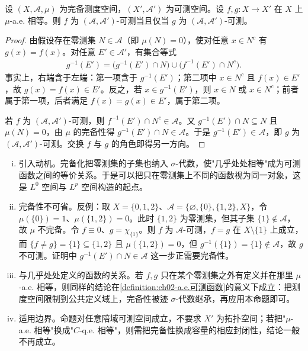 \documentclass[../../main.tex]{subfiles}%
\begin{document}
\begin{proposition}\label{proposition:ch02-a.e.相等可测}
设 $(X,\mathscr A,\mu)$ 为完备测度空间，$(X',\mathscr A')$ 为可测空间。设 $f,g:X\to X'$ 在 $X$ 上 $\mu$-a.e. 相等。则 $f$ 为 $(\mathscr A,\mathscr A')$-可测当且仅当 $g$ 为 $(\mathscr A,\mathscr A')$-可测。
\end{proposition}

\begin{proof}
由假设存在零测集 $N\in\mathscr A$（即 $\mu(N)=0$），使对任意 $x\in N^c$ 有 $g(x)=f(x)$。对任意 $E'\in\mathscr A'$，有集合等式
\begin{align*}
g^{-1}(E')=\bigl(g^{-1}(E')\cap N\bigr)\cup\bigl(f^{-1}(E')\cap N^c\bigr).
\end{align*}
事实上，右端含于左端：第一项含于 $g^{-1}(E')$；第二项中 $x\in N^c$ 且 $f(x)\in E'$，故 $g(x)=f(x)\in E'$。反之，若 $x\in g^{-1}(E')$，则 $x\in N$ 或 $x\in N^c$；前者属于第一项，后者满足 $f(x)=g(x)\in E'$，属于第二项。

若 $f$ 为 $(\mathscr A,\mathscr A')$-可测，则 $f^{-1}(E')\cap N^c\in\mathscr A$。又 $g^{-1}(E')\cap N\subseteq N$ 且 $\mu(N)=0$，由 $\mu$ 的完备性得 $g^{-1}(E')\cap N\in\mathscr A$。于是 $g^{-1}(E')\in\mathscr A$，即 $g$ 为 $(\mathscr A,\mathscr A')$-可测。交换 $f$ 与 $g$ 的角色即得另一方向。
\end{proof}

\begin{remark}\label{remark:ch02-a.e.相等}
\begin{enumerate}[(i)]
\item 引入动机。完备化把零测集的子集也纳入 $\sigma$-代数，使"几乎处处相等"成为可测函数之间的等价关系。于是可以把只在零测集上不同的函数视为同一对象，这是 $L^0$ 空间与 $L^p$ 空间构造的起点。
\item 完备性不可省。反例：取 $X=\{0,1,2\}$、$\mathscr A=\{\varnothing,\{0\},\{1,2\},X\}$，令 $\mu(\{0\})=1$、$\mu(\{1,2\})=0$。此时 $\{1,2\}$ 为零测集，但其子集 $\{1\}\notin\mathscr A$，故 $\mu$ 不完备。令 $f\equiv0$、$g=\chi_{\{1\}}$。则 $f$ 为 $\mathscr A$-可测，$f=g$ 在 $X\setminus\{1\}$ 上成立，而 $\{f\neq g\}=\{1\}\subseteq\{1,2\}$ 且 $\mu(\{1,2\})=0$，但 $g^{-1}(\{1\})=\{1\}\notin\mathscr A$，故 $g$ 不可测。证明中 $g^{-1}(E')\cap N\in\mathscr A$ 这一步正需要完备性。
\item 与几乎处处定义的函数的关系。若 $f,g$ 只在某个零测集之外有定义并在那里 $\mu$-a.e. 相等，则同样的结论在\cref{definition:ch02-a.e.可测函数}的意义下成立：把测度空间限制到公共定义域上，完备性被迹 $\sigma$-代数继承，再应用本命题即可。
\item 适用边界。命题对任意陪域可测空间成立，不要求 $X'$ 为拓扑空间；若把"$\mu$-a.e. 相等"换成"$C$-q.e. 相等"，则需把完备性换成容量的相应封闭性，结论一般不再成立。
\end{enumerate}
\end{remark}
\end{document}
